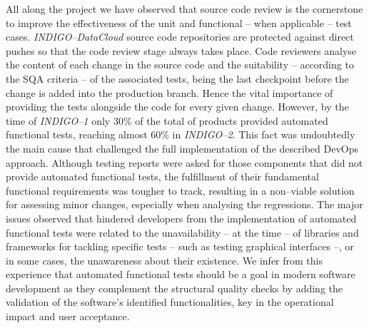 All along the project we have observed that source code review is the cornerstone to
improve the effectiveness of the unit and functional -- when applicable -- test cases. 
{\sl INDIGO--DataCloud} source code repositories are protected against direct pushes 
so that the code review stage always takes place. Code reviewers analyse the content
of each change in the source code and the suitability -- according to the SQA criteria -- of the
associated tests, being the last checkpoint before the change is added into the
production branch. Hence the vital importance of providing the tests alongside the
code for every given change.
However, by the time of
{\sl INDIGO--1} only 30\% of the total of products provided automated functional tests,
reaching almost 60\% in {\sl INDIGO--2}. This fact was undoubtedly the main cause that challenged the full implementation of 
the described DevOps approach. 
Although testing reports were asked for those components that did not provide automated functional tests, the fulfillment of 
their fundamental functional requirements was tougher to track, resulting in a non--viable
solution for assessing minor changes, especially when analysing the regressions. The major issues observed that hindered developers from the 
implementation of automated functional tests were related to the unavailability
-- at the time -- of libraries and frameworks for tackling specific tests -- such as 
testing graphical interfaces --, or in some cases, the unawareness about their existence.
We infer from this experience that automated functional tests should be a goal in modern
software development as they complement the structural quality checks by adding the
validation of the software's identified functionalities, key in the operational impact 
and user acceptance. 

